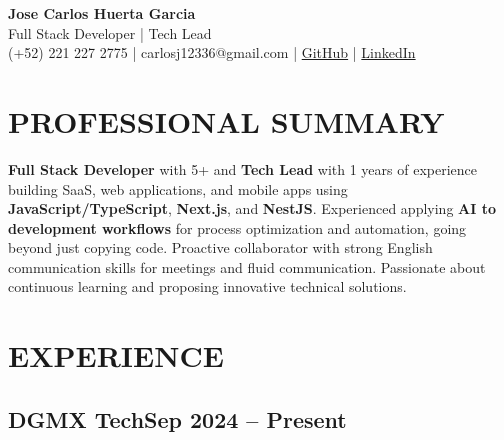 \documentclass[a4paper,10pt]{article}
\newcommand{\kw}[1]{\textbf{\textcolor{keyword}{#1}}}
\begin{document}
\begin{center}
{\bfseries\LARGE Jose Carlos Huerta Garcia} \\
Full Stack Developer | Tech Lead \\
(+52) 221 227 2775 | carlosj12336@gmail.com | \href{https://github.com/jcarloshg}{GitHub} | \href{https://www.linkedin.com/in/jose-carlos-huerta-garcia-773952212}{LinkedIn}
\end{center}

\section*{PROFESSIONAL SUMMARY}
\kw{Full Stack Developer} with 5+ and \kw{Tech Lead} with 1 years of experience building SaaS, web applications, and mobile apps using \kw{JavaScript/TypeScript}, \kw{Next.js}, and \kw{NestJS}. Experienced applying \kw{AI to development workflows} for process optimization and automation, going beyond just copying code. Proactive collaborator with strong English communication skills for meetings and fluid communication. Passionate about continuous learning and proposing innovative technical solutions.

\section*{EXPERIENCE}

\subsection*{DGMX Tech\hfill\textbf{Sep 2024 -- Present}}
\end{document}
